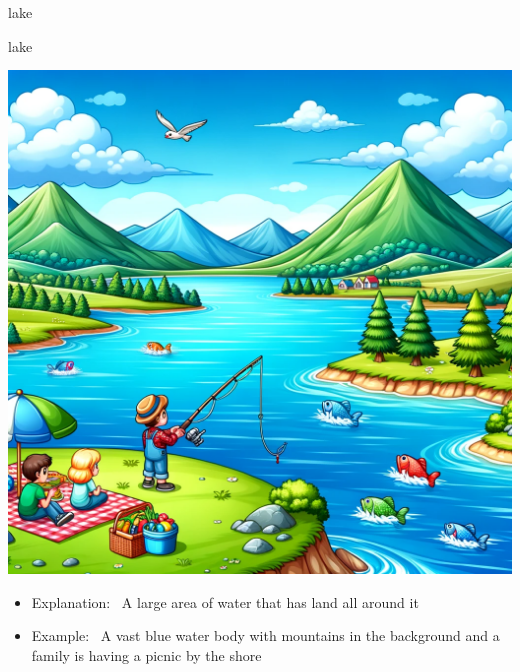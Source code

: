 \documentclass[avery5371, grid,frame]{flashcards}
\begin{document}
\begin{flashcard}{lake}
\begin{center}
\begin{minipage}[c]{.45\textwidth}
        \end{minipage}
    \end{center}
    \vspace*{\fill}
\end{flashcard}\begin{flashcard}{lake}
    \vspace*{\fill}
    \begin{center}
        \begin{minipage}[c]{.45\textwidth}
            \includegraphics[width=\textwidth]{cards/l/lake/lake - A vast blue water body with mountains in the background and a family is having a picnic by the shore.png}
        \end{minipage}
        \begin{minipage}[c]{.45\textwidth}
            \begin{itemize}\setlength\itemsep{12pt}
            \item Explanation: \ A large area of water that has land all around it
            \item Example: \ A vast blue water body with mountains in the background and a family is having a picnic by the shore
            \end{itemize}
        \end{minipage}
    \end{center}

\end{flashcard}
\end{document}
